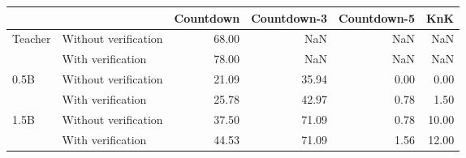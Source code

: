\begin{tabular}{llrrrr}
\toprule
 &  & Countdown & Countdown-3 & Countdown-5 & KnK \\
\midrule
\multirow[t]{2}{*}{Teacher} & Without verification & 68.00 & NaN & NaN & NaN \\
 & With verification & 78.00 & NaN & NaN & NaN \\
\cline{1-6}
\multirow[t]{2}{*}{0.5B} & Without verification & 21.09 & 35.94 & 0.00 & 0.00 \\
 & With verification & 25.78 & 42.97 & 0.78 & 1.50 \\
\cline{1-6}
\multirow[t]{2}{*}{1.5B} & Without verification & 37.50 & 71.09 & 0.78 & 10.00 \\
 & With verification & 44.53 & 71.09 & 1.56 & 12.00 \\
\cline{1-6}
\bottomrule
\end{tabular}
